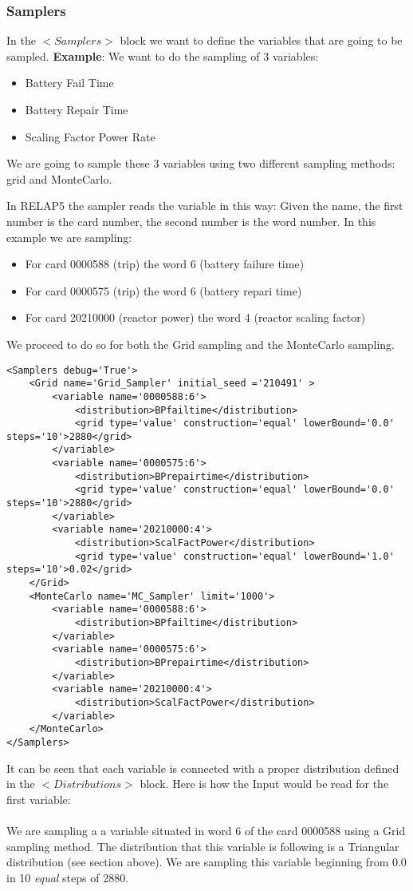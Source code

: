 \subsubsection{Samplers}
In the $<Samplers>$ block we want to define the variables that are going to be sampled. 
\textbf{Example}:
We want to do the sampling of 3 variables:
\begin{itemize}
\item Battery Fail Time
\item Battery Repair Time
\item Scaling Factor Power Rate
\end{itemize}
We are going to sample these 3 variables using two different sampling methods: grid and MonteCarlo.

In RELAP5 the sampler reads the variable in this way:
Given the name, the first number is the card number, the second number is the word number.
In this example we are sampling:
\begin{itemize}
\item For card 0000588 (trip) the word 6 (battery failure time)
\item For card 0000575 (trip) the word 6 (battery repari time)
\item For card 20210000 (reactor power) the word 4 (reactor scaling factor)
\end{itemize}

We proceed to do so for both the Grid sampling and the MonteCarlo sampling.

\begin{lstlisting}[style=XML]
<Samplers debug='True'>
    <Grid name='Grid_Sampler' initial_seed ='210491' >
        <variable name='0000588:6'>
            <distribution>BPfailtime</distribution>
            <grid type='value' construction='equal' lowerBound='0.0' steps='10'>2880</grid>
        </variable>
        <variable name='0000575:6'>
            <distribution>BPrepairtime</distribution>
            <grid type='value' construction='equal' lowerBound='0.0' steps='10'>2880</grid>
        </variable>
		<variable name='20210000:4'>
            <distribution>ScalFactPower</distribution>
            <grid type='value' construction='equal' lowerBound='1.0' steps='10'>0.02</grid>
	</Grid>
	<MonteCarlo name='MC_Sampler' limit='1000'>
		<variable name='0000588:6'>
            <distribution>BPfailtime</distribution>
		</variable>
		<variable name='0000575:6'>
            <distribution>BPrepairtime</distribution>
		</variable>
		<variable name='20210000:4'>
            <distribution>ScalFactPower</distribution>
		</variable>
	</MonteCarlo>
</Samplers>
\end{lstlisting}
It can be seen that each variable is connected with a proper distribution defined in the $<Distributions>$ block. 
Here is how the Input would be read for the first variable:
\\\\
We are sampling a a variable situated in word 6 of the card 0000588 using a Grid sampling method. The distribution that this variable is following is a Triangular distribution (see section above). We are sampling this variable beginning from 0.0 in 10 \textit{equal} steps of 2880. 
